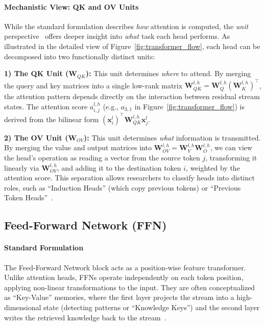 \documentclass[11pt,letterpaper]{mystyle}
\begin{document}
\paragraph{Mechanistic View: QK and OV Units}
While the standard formulation describes \textit{how} attention is computed, the \textit{unit} perspective~\citep{elhage2021mathematical} offers deeper insight into \textit{what} task each head performs. As illustrated in the detailed view of Figure~\ref{fig:transformer_flow}, each head can be decomposed into two functionally distinct units:

\textbf{1) The QK Unit ($\mathbf{W}_{QK}$):} This unit determines \textit{where} to attend. By merging the query and key matrices into a single low-rank matrix $\mathbf{W}_{QK}^{l,h} = \mathbf{W}_Q^{l,h} (\mathbf{W}_K^{l,h})^\top$, the attention pattern depends directly on the interaction between residual stream states. The attention score $a_{i,j}^{l,h}$ (e.g., $a_{3,1}$ in Figure~\ref{fig:transformer_flow}) is derived from the bilinear form $(\mathbf{x}_i^l)^\top \mathbf{W}_{QK}^{l,h} \mathbf{x}_j^l$.

\textbf{2) The OV Unit ($\mathbf{W}_{OV}$):} This unit determines \textit{what} information is transmitted. By merging the value and output matrices into $\mathbf{W}_{OV}^{l,h} = \mathbf{W}_V^{l,h} \mathbf{W}_O^{l,h}$, we can view the head's operation as reading a vector from the source token $j$, transforming it linearly via $\mathbf{W}_{OV}^{l,h}$, and adding it to the destination token $i$, weighted by the attention score. This separation allows researchers to classify heads into distinct roles, such as ``Induction Heads'' (which copy previous tokens) or ``Previous Token Heads''~\citep{olsson2022incontextlearninginductionheads,singh2024needs,wang2024transformers}.


\subsection{Feed-Forward Network (FFN)}
\label{sec:ffn}
\paragraph{Standard Formulation}
The Feed-Forward Network block acts as a position-wise feature transformer. Unlike attention heads, FFNs operate independently on each token position, applying non-linear transformations to the input. They are often conceptualized as ``Key-Value'' memories, where the first layer projects the stream into a high-dimensional state (detecting patterns or ``Knowledge Keys'') and the second layer writes the retrieved knowledge back to the stream~\citep{geva2021transformer,geva2022transformer,dai2022knowledge}.
\end{document}
